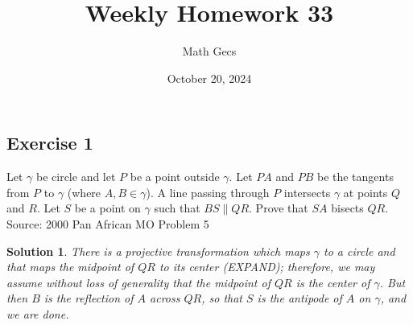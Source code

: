 \documentclass[12pt]{article}
\title{Weekly Homework 33}
\author{Math Gecs}
\date{October 20, 2024}
\newtheorem*{solution*}{Solution}
\begin{document}
\maketitle

\subsection*{Exercise 1}
Let $\gamma$ be circle and let $P$ be a point outside $\gamma$. Let $PA$ and $PB$ be the tangents from $P$ to $\gamma$ (where $A, B \in \gamma$). A line passing through $P$ intersects $\gamma$ at points $Q$ and $R$. Let $S$ be a point on $\gamma$ such that $BS \parallel QR$. Prove that $SA$ bisects $QR$.\\

Source: 2000 Pan African MO Problem 5\\

\begin{solution*}
There is a projective transformation which maps $\gamma$ to a circle and that maps the midpoint of $QR$ to its center (EXPAND); therefore, we may assume without loss of generality that the midpoint of $QR$ is the center of $\gamma$. But then $B$ is the reflection of $A$ across $QR$, so that $S$ is the antipode of $A$ on $\gamma$, and we are done.
\end{solution*}
\end{document}
